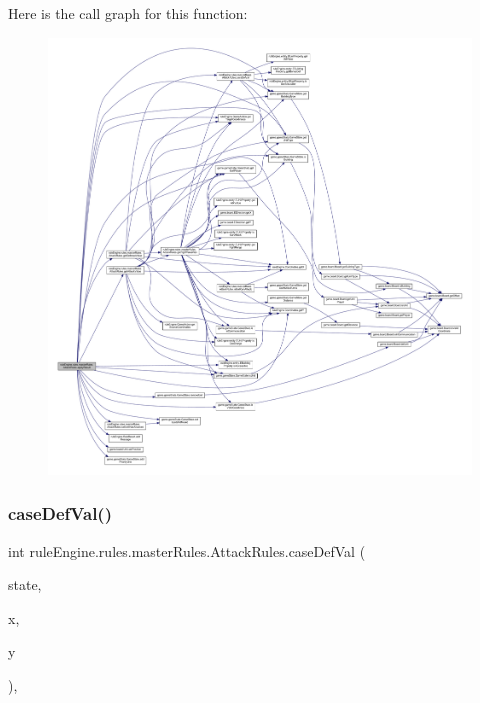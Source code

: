 Here is the call graph for this function\+:
\nopagebreak
\begin{figure}[H]
\begin{center}
\leavevmode
\includegraphics[width=350pt]{classrule_engine_1_1rules_1_1master_rules_1_1_attack_rules_ae45bbf8fb4c1cef3733c6051f8b8b008_cgraph}
\end{center}
\end{figure}
\mbox{\label{classrule_engine_1_1rules_1_1master_rules_1_1_attack_rules_ae5503b7c9d28aa2ca0e242b9c2411b89}} 
\subsubsection{\texorpdfstring{case\+Def\+Val()}{caseDefVal()}}
{\footnotesize\ttfamily int rule\+Engine.\+rules.\+master\+Rules.\+Attack\+Rules.\+case\+Def\+Val (\begin{DoxyParamCaption}\item[{\mbox{\hyperlink{classgame_1_1game_state_1_1_game_state}{Game\+State}}}]{state,  }\item[{int}]{x,  }\item[{int}]{y }\end{DoxyParamCaption})\hspace{0.3cm}{\ttfamily [inline]}, {\ttfamily [private]}}

